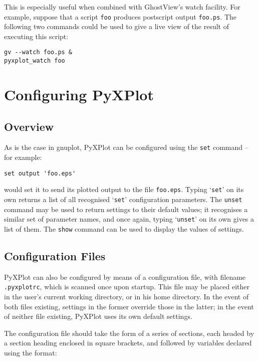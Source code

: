 \documentclass[a4paper,onecolumn,11pt]{book}
\begin{document}
This is especially useful when combined with GhostView's watch facility. For
example, suppose that a script \texttt{foo} produces postscript output
\texttt{foo.ps}. The following two commands could be used to give a live view
of the result of executing this script:

\begin{verbatim}
gv --watch foo.ps &
pyxplot_watch foo
\end{verbatim}

\chapter{Configuring PyXPlot}

\section{Overview}

\label{configuration}

As is the case in gnuplot, PyXPlot can be configured using the \noindent
\texttt{set} command -- for example:

\begin{verbatim}set output 'foo.eps'\end{verbatim}

\noindent would set it to send its plotted output to the file
\texttt{foo.eps}.  Typing `\texttt{set}' on its own returns a list of all
recognised `\texttt{set}' configuration parameters. The \texttt{unset} command
may be used to return settings to their default values; it recognises a similar
set of parameter names, and once again, typing `\texttt{unset}' on its own
gives a list of them. The \texttt{show} command can be used to display the
values of settings.

\section{Configuration Files}
\label{config_files}

PyXPlot can also be configured by means of a configuration file, with filename
\texttt{.pyxplotrc}, which is scanned once upon startup. This file may be
placed either in the user's current working directory, or in his home
directory. In the event of both files existing, settings in the former override
those in the latter; in the event of neither file existing, PyXPlot uses its
own default settings.

The configuration file should take the form of a series of sections, each
headed by a section heading enclosed in square brackets, and followed by
variables declared using the format:
\end{document}
